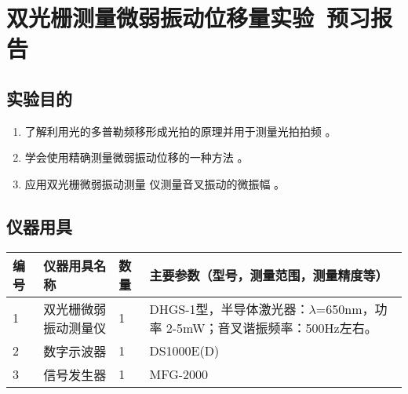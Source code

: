 \documentclass[dvipsnames, svgnames,a4paper,11pt]{article}
\newcommand{\exname}{双光栅测量微弱振动位移量实验}%
\begin{document}
\clearpage
\tableofcontents
\clearpage

\setcounter{section}{0}
\section{\exname\ \textbf{预习报告}}
	
\subsection{实验目的}
\begin{enumerate}
	\item 了解利用光的多普勒频移形成光拍的原理并用于测量光拍拍频 。
	\item 学会使用精确测量微弱振动位移的一种方法 。
	\item 应用双光栅微弱振动测量 仪测量音叉振动的微振幅 。
\end{enumerate}
\subsection{仪器用具}
\begin{table}[htbp]
	\centering
	\renewcommand\arraystretch{1.6}
	\begin{tabular}{p{}|p{}|p{}|p{}}
	\hline
	编号& 仪器用具名称 & 数量 &  主要参数（型号，测量范围，测量精度等） \\
	\hline
	1&双光栅微弱振动测量仪&1 &DHGS-1型，半导体激光器：$\lambda$=650nm，功率 2-5mW；音叉谐振频率：500Hz左右。\\
	2&数字示波器&1&DS1000E(D) \\
	3&信号发生器&1 &MFG-2000\\
	\hline
\end{tabular}
\end{table}
\end{document}
